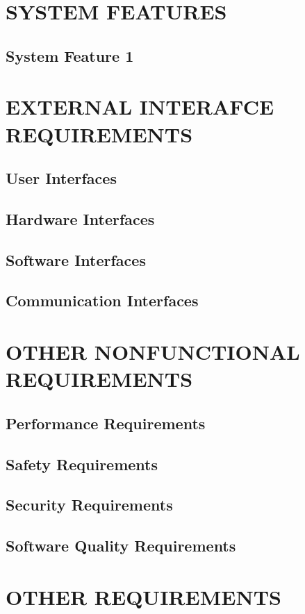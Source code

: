 \documentclass{article}
\begin{document}
\section{SYSTEM FEATURES}
\subsection{System Feature 1}

\section{EXTERNAL INTERAFCE REQUIREMENTS}
\subsection{User Interfaces}
\subsection{Hardware Interfaces}
\subsection{Software Interfaces}
\subsection{Communication Interfaces}

\section{OTHER NONFUNCTIONAL REQUIREMENTS}
\subsection{Performance Requirements}

\subsection{Safety Requirements}

\subsection{Security Requirements}

\subsection{Software Quality Requirements}


\section{OTHER REQUIREMENTS}
\end{document}
